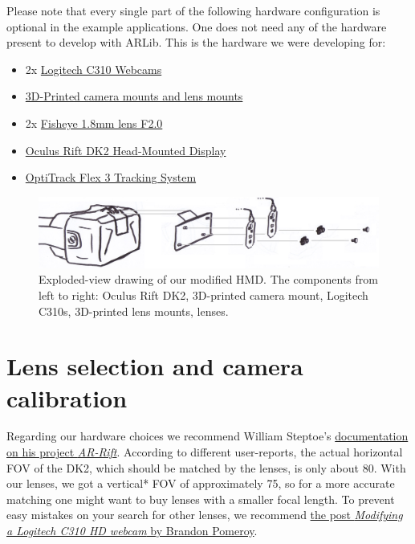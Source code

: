 Please note that every single part of the following hardware
configuration is optional in the example applications. One does not need
any of the hardware present to develop with ARLib.
This is the hardware we were developing for:
\begin{itemize}
	\item{2x \href{http://www.logitech.com/de-de/product/hd-webcam-c310}{Logitech C310 Webcams}}\cite{c310}
	\item{\href{https://github.com/ands/OculusMeetsAR/tree/master/Hardware/Printmodels}{3D-Printed camera mounts and lens mounts}}\cite{mounts}
	\item{2x \href{http://www.camera2000.com/en/cctv-board-security-video-camera-1-8mm-lens-f2-0.html}{Fisheye 1.8mm lens F2.0}}\cite{lenses}
	\item{\href{https://www.oculus.com/dk2/}{Oculus Rift DK2 Head-Mounted Display}}\cite{dk2}
	\item{\href{http://www.optitrack.com/products/flex-3/}{OptiTrack Flex 3 Tracking System}}\cite{optitrack}
\end{itemize}

\begin{figure}[htb!]
	\centering
	\includegraphics{explosion}
	\vspace{1mm}
	\caption{Exploded-view drawing of our modified HMD. The components from left to right: Oculus Rift DK2, 3D-printed camera mount, Logitech C310s, 3D-printed lens mounts, lenses.}
	\label{fig:explosion}
\end{figure}

\section{Lens selection and camera calibration}\label{lens-selection-and-camera-calibration}

Regarding our hardware choices we recommend William Steptoe's
\href{http://willsteptoe.com/post/67399683294/ar-rift-camera-selection-part-2}{documentation
on his project \emph{AR-Rift}}\cite{arrift}. According to different user-reports, the actual
horizontal FOV of the DK2, which should be matched by the lenses, is
only about 80\textdegree. With our lenses, we got a vertical* FOV of
approximately 75\textdegree, so for a more accurate matching one might want to buy
lenses with a smaller focal length. To prevent easy mistakes on your
search for other lenses, we recommend
\href{http://pomeroyprinting.blogspot.de/2014/04/modifying-logitech-c310-hd-webcam.html}{the
post \emph{Modifying a Logitech C310 HD webcam} by Brandon Pomeroy}\cite{modifying_lenses}.

